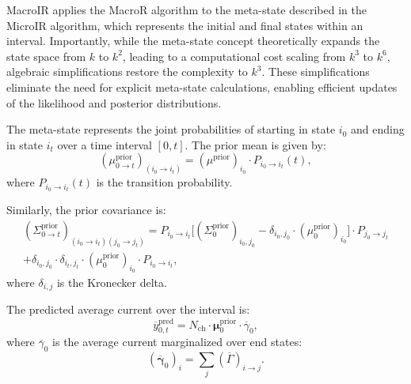 \documentclass[pdflatex,sn-mathphys-num]{sn-jnl}%
\theoremstyle{thmstyleone}%
\theoremstyle{thmstyletwo}%
\theoremstyle{thmstylethree}%
\begin{document}
MacroIR applies the MacroR algorithm to the meta-state described in the MicroIR algorithm, which represents the initial and final states within an interval. Importantly, while the meta-state concept theoretically expands the state space from \( k \) to \( k^2 \), leading to a computational cost scaling from \( k^3 \) to \( k^6 \), algebraic simplifications restore the complexity to \( k^3 \). These simplifications eliminate the need for explicit meta-state calculations, enabling efficient updates of the likelihood and posterior distributions.

The meta-state represents the joint probabilities of starting in state \( i_0 \) and ending in state \( i_t \) over a time interval \( [0, t] \). The prior mean is given by:
\begin{equation}
	(\mu^{\text{prior}}_{0 \rightarrow t})_{(i_0 \rightarrow i_t)} = (\mu^{\text{prior}})_{i_0} \cdot P_{i_0 \rightarrow i_t}(t),
	\label{eq:meta_mean_prior}
\end{equation}
where \( P_{i_0 \rightarrow i_t}(t) \) is the transition probability.

Similarly, the prior covariance is:
\begin{multline}
	(\Sigma^{\text{prior}}_{0 \rightarrow t})_{(i_0 \rightarrow i_t)(j_0 \rightarrow j_t)} = 
	P_{i_0 \rightarrow i_t} \big[(\Sigma^{\text{prior}}_0)_{i_0, j_0} - \delta_{i_0, j_0} \cdot (\mu^{\text{prior}}_0)_{i_0} \big] \cdot P_{j_0 \rightarrow j_t} \\
	+ \delta_{i_0, j_0} \cdot \delta_{i_t, j_t} \cdot (\mu^{\text{prior}}_0)_{i_0} \cdot P_{i_0 \rightarrow i_t},
	\label{eq:meta_covariance_prior}
\end{multline}
where \( \delta_{i, j} \) is the Kronecker delta.

The predicted average current over the interval is:
\begin{equation}
	\overline{y}^{\text{pred}}_{0,t} = N_{\text{ch}} \cdot \mathbf{\mu}^{\text{prior}}_{0} \cdot \overline{\gamma}_{0},
	\label{eq:macro_interval_predicted_y}
\end{equation}
where \( \overline{\gamma}_{0} \) is the average current marginalized over end states:
\begin{equation}
	(\overline{\mathbf{\gamma}}_{0})_i = \sum_j (\overline{\Gamma})_{i \rightarrow j}.
\end{equation}
\end{document}
